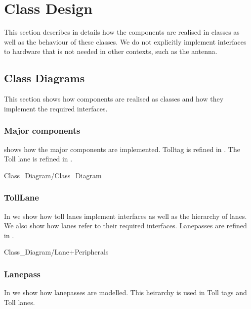 \section{Class Design}
\madeby{\jb}{\mt} This section describes in details how the components are realised in classes as well as the behaviour of these classes. We do not explicitly implement interfaces to hardware that is not needed in other contexts, such as the antenna.

\subsection{Class Diagrams}
This section shows how components are realised as classes and how they implement the required interfaces. 

\subsubsection{Major components}
 shows how the major components are implemented. Tolltag is refined in . The Toll lane is refined in .
\begin{mylandscapefigure}{Class_Diagram/Class_Diagram}
\caption{Class Model of major components.\madeby{\af}{\mb}}
\label{fig:class-class}
\end{mylandscapefigure}



\subsubsection{TollLane}
In  we show how toll lanes implement interfaces as well as the hierarchy of lanes. We also show how lanes refer to their required interfaces. Lanepasses are refined in .
\begin{mylandscapefigure}{Class_Diagram/Lane+Peripherals}
\caption{Class Model of the TollLane.\madeby{\af}{\kj}}
\label{fig:class-lane}
\end{mylandscapefigure}

\subsubsection{Lanepass}
In  we show how lanepasses are modelled. This heirarchy is used in Toll tags and Toll lanes.

